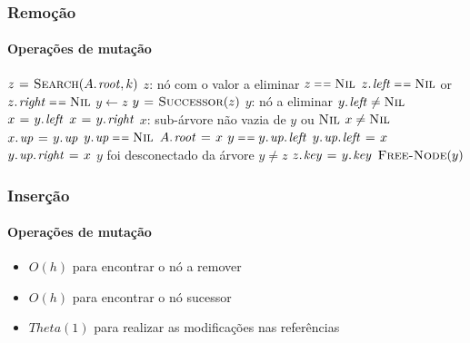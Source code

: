 \documentclass{beamer}
\begin{document}
\begin{frame}

\frametitle{Remoção}
\framesubtitle{Operações de mutação}

\begin{footnotesize}
\begin{codebox}
  \li $z \gets \proc{Search}(\attrib{A}{root}, k)$ \Comment $z$: nó com o valor a eliminar
  \li \If $z \isequal \const{Nil}$
  \li \Then \Return
      \End
  \li \If $\attrib{z}{left} \isequal \const{Nil}$
  or $\attrib{z}{right} \isequal \const{Nil}$
  \li \Then $y \gets z$
  \li \Else $y \mathrel{\hspace{1pt}=\hspace{1pt}} \textnormal{\scshape Successor}(z)$ \Comment $y$: nó a eliminar
      \End
  \li \If $\attrib{y}{left} \neq \const{Nil}$
  \li \Then $x \gets \attrib{y}{left}$
  \li \Else $x \gets \attrib{y}{right}$   \Comment $x$: sub-árvore não vazia de $y$ ou $\textnormal{\scshape Nil}$
      \End
  \li \If $x \neq \textnormal{\scshape Nil}$
  \li \Then $\attrib{x}{up} \gets \attrib{y}{up}$
       \End
  \li \If $\attrib{y}{up} \isequal \const{Nil}$
  \li \Then $\attrib{A}{root} \gets x$
  \li \Else \If $y \isequal \attrib{\attrib{y}{up}}{left}$
  \li   \Then $\attrib{\attrib{y}{up}}{left} \gets x$
  \li   \Else $\attrib{\attrib{y}{up}}{right} \gets x$ \Comment $y$ foi desconectado da árvore
        \End
      \End
  \li \If $y \neq z$
  \li \Then $\attrib{z}{key} \gets \attrib{y}{key}$
      \End
  \li $\textnormal{\scshape Free-Node}(y)$
\end{codebox}
\end{footnotesize}
\end{frame}

\begin{frame}

\frametitle{Inserção}
\framesubtitle{Operações de mutação}

\begin{itemize}

  \item $O(h)$ para encontrar o nó a remover

  \item $O(h)$ para encontrar o nó sucessor

  \item $Theta(1)$ para realizar as modificações nas referências

\end{itemize}


\end{frame}
\end{document}
